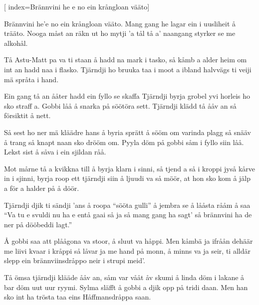 

[					%
	index={Brännvini he e no ein krångloan vääto}]						%
	

\beginverse*						%
Brännvini he'e no ein krångloan vääto.
Mang gang he lagar ein i uusliheit å trääto.
Nooga måst an räkn ut ho mytji 'a tål
tå a' naangang styrker se me alkohål.
\endverse							%

\beginverse*						%
Tå Astu-Matt pa va ti staan å hadd na mark i tasko,
så kåmb a alder heim om int an hadd naa i flasko.
Tjärndji ho bruuka taa i moot a ibland
halvvägs ti veiji mä språta i hand.
\endverse							%

\beginverse*						%
Ein gang tå an ååter hadd ein fyllo se skaffa
Tjärndji byrja grobel yvi horleis ho sko straff a.
Gobbi låå å snarka på söötöra sett.
Tjärndji klädd tå ååv an så försiktit å nett.
\endverse							%

\beginverse*						%
Så sest ho ner mä kläädre hans å byria sprätt å 
sööm om
varinda plagg så snääv å trang så knapt naan sko
drööm om.
Pyyla döm på gobbi såm i fyllo siin låå.
Lekst sist å såva i ein sjildan råå.
\endverse							%

\beginverse*						%
Mot mårne tå a kvikkna till å byrja klarn i sinni,
så tjend a så i kroppi jyså kårve in i sjinni,
byrja roop ett tjärndji siin å ljuudi va så möör,
at hon sko kom å jälp a för a halder på å döör.
\endverse							%

\beginverse*						%
Tjärndji djik ti sändji 'ans å roopa ``sööta gulli''
å jembra se å lååsta rååm å saa ``Va tu e svuldi
nu ha e entå gaai så ja så mang gang ha sagt'
så brännvini ha de ner på dööbeddi lagt.''
\endverse							%

\beginverse*						%
Å gobbi saa att plåågona va stoor, å sluut va håppi.
Men kåmbä ja ifråån dehäär me liivi kvaar i kråppi
så låvar ja me hand på monn, å minns va ja seir,
ti alldär slepp ein brännviinsdråppo neir i strupi meid'.
\endverse							%

\beginverse*						%
Tå ömsa tjärndji klääde ååv an, såm var vååt åv skumi
å linda döm i lakane å bar döm uut uur ryymi.
Sylma släfft å gobbi a djik opp på tridi daan.
Men han sko int ha trösta taa eins Håffmansdråppa
saan.
\endverse							%

\endsong							%